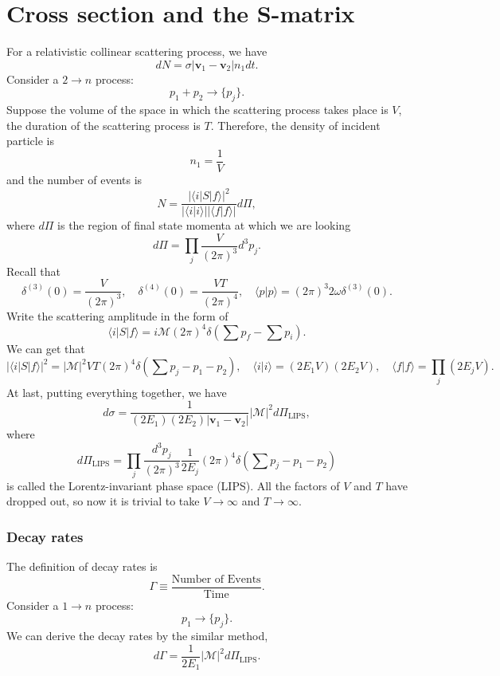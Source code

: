 \section{Cross section and the S-matrix}
\noindent
For a relativistic collinear scattering process, we have
\[dN = \sigma |\bm{v}_1 - \bm{v}_2| n_1 dt.\]
Consider a  $2 \to n$ process:
\[p_1 + p_2 \to \{p_j\}.\]
Suppose the volume of the space in which the scattering process takes place is $V$, the duration of the scattering process is $T$. 
Therefore, the density of incident particle is
\[n_1 = \frac{1}{V}\]
and the number of events is
\[N = \frac{|\langle i | S | f \rangle|^2}{|\langle i | i \rangle||\langle f | f \rangle|} d\Pi ,\]
where $d\Pi$ is the region of final state momenta at which we are looking
\[d\Pi = \prod_j \frac{V}{(2\pi)^3} d^3 p_j.\]
Recall that
\[\delta^{(3)}(0) = \frac{V}{(2\pi)^3} , \quad \delta^{(4)}(0) = \frac{VT}{(2\pi)^4} , \quad \langle p | p \rangle = (2\pi)^3 2\omega \delta^{(3)}(0).\]
Write the scattering amplitude in the form of
\[\langle i | S | f \rangle = i\mathcal{M}(2\pi)^4\delta(\sum p_f-\sum p_i).\]
We can get that
\[|\langle i | S | f \rangle|^2 = |\mathcal{M}|^2 VT (2\pi)^4 \delta(\sum p_j - p_1 - p_2) , \quad \langle i | i \rangle = (2E_1V) (2E_2V) , \quad \langle f | f \rangle = \prod_j (2E_jV).\]
At last, putting everything together, we have
\[d\sigma = \frac{1}{(2E_1)(2E_2)|\bm{v}_1-\bm{v}_2|} |\mathcal{M}|^2 d\Pi_{\mathrm{LIPS}},\]
where
\[d\Pi_{\mathrm{LIPS}} = \prod_j \frac{d^3p_j}{(2\pi)^3} \frac{1}{2E_j} (2\pi)^4 \delta(\sum p_j - p_1 - p_2)\]
is called the Lorentz-invariant phase space (LIPS).
All the factors of $V$ and $T$ have dropped out, so now it is trivial to take $V \to \infty$ and $T \to \infty$. 

\subsubsection{Decay rates}
\noindent
The definition of decay rates is
\[\Gamma \equiv \frac{\mbox{Number of Events}}{\mbox{Time}}.\]
Consider a  $1 \to n$ process:
\[p_1 \to \{p_j\}.\]
We can derive the decay rates by the similar method,
\[d\Gamma = \frac{1}{2E_1} |\mathcal{M}|^2 d\Pi_{\mathrm{LIPS}} .\]

